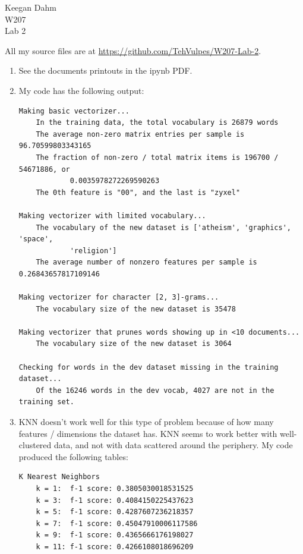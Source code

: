\documentclass{article}
\begin{document}

\begin{flushright}
Keegan Dahm \\
W207 \\
Lab 2
\end{flushright}

All my source files are at \href{https://github.com/TehVulpes/W207-Lab-2}{https://github.com/TehVulpes/W207-Lab-2}.

\begin{enumerate}[start=1]
\item %
    See the documents printouts in the ipynb PDF.
    
\item %
    My code has the following output:
    
    \begin{Verbatim}
Making basic vectorizer...
    In the training data, the total vocabulary is 26879 words
    The average non-zero matrix entries per sample is 96.70599803343165
    The fraction of non-zero / total matrix items is 196700 / 54671886, or
            0.0035978272269590263
    The 0th feature is "00", and the last is "zyxel"

Making vectorizer with limited vocabulary...
    The vocabulary of the new dataset is ['atheism', 'graphics', 'space',
            'religion']
    The average number of nonzero features per sample is 0.26843657817109146

Making vectorizer for character [2, 3]-grams...
    The vocabulary size of the new dataset is 35478

Making vectorizer that prunes words showing up in <10 documents...
    The vocabulary size of the new dataset is 3064

Checking for words in the dev dataset missing in the training dataset...
    Of the 16246 words in the dev vocab, 4027 are not in the training set.
    \end{Verbatim}
    
\newpage
    
\item %
    KNN doesn't work well for this type of problem because of how many features / dimensions the dataset has. KNN seems to work better with well-clustered data, and not with data scattered around the periphery. My code produced the following tables:
    
    \begin{Verbatim}
K Nearest Neighbors
    k = 1:  f-1 score: 0.3805030018531525
    k = 3:  f-1 score: 0.4084150225437623
    k = 5:  f-1 score: 0.4287607236218357
    k = 7:  f-1 score: 0.45047910006117586
    k = 9:  f-1 score: 0.4365666176198027
    k = 11: f-1 score: 0.4266108018696209


\end{Verbatim}
\end{enumerate}
\end{document}
